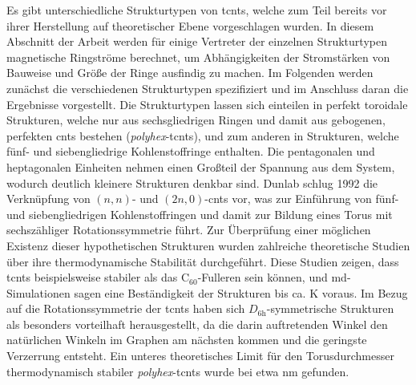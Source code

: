 Es gibt unterschiedliche Strukturtypen von \acp{tcnt}, welche zum Teil bereits vor ihrer Herstellung auf theoretischer Ebene vorgeschlagen wurden. In diesem Abschnitt der Arbeit werden für einige Vertreter der einzelnen Strukturtypen magnetische Ringströme berechnet, um Abhängigkeiten der Stromstärken von Bauweise und Größe der Ringe ausfindig zu machen. Im Folgenden werden zunächst die verschiedenen Strukturtypen spezifiziert und im Anschluss daran die Ergebnisse vorgestellt.   
Die Strukturtypen lassen sich einteilen in perfekt toroidale Strukturen, welche nur aus sechsgliedrigen Ringen und damit aus gebogenen, perfekten \acp{cnt} bestehen (\textit{polyhex}-\acp{tcnt}), und zum anderen in Strukturen, welche fünf- und siebengliedrige Kohlenstoffringe enthalten. Die pentagonalen und heptagonalen Einheiten nehmen einen Großteil der Spannung aus dem System, wodurch deutlich kleinere Strukturen denkbar sind. Dunlab\supercite{dunlap1992connecting} schlug 1992 die Verknüpfung von $(n,n)$- und $(2n,0)$-\acp{cnt} vor, was zur Einführung von fünf- und siebengliedrigen Kohlenstoffringen und damit zur Bildung eines Torus mit sechszähliger Rotationssymmetrie führt. Zur Überprüfung einer möglichen Existenz dieser hypothetischen Strukturen wurden zahlreiche theoretische Studien über ihre thermodynamische Stabilität durchgeführt. Diese Studien zeigen, dass \acp{tcnt} beispielsweise stabiler als das C$_{60}$-Fulleren\supercite{dunlap1992connecting,itoh1993toroidal,ihara1993toroidal,itoh1993toroidal2} sein können, und \ac{md}-Simulationen\supercite{itoh1993toroidal,hod2003carbon,tacsci2005stability,chen2011thermal} sagen eine Beständigkeit der Strukturen bis ca. \unit[2000]{K} voraus. Im Bezug auf die Rotationssymmetrie der \acp{tcnt} haben sich $D_{\text{6h}}$-symmetrische Strukturen als besonders vorteilhaft herausgestellt\supercite{liu2011structure,ihara1995helically}, da die darin auftretenden Winkel den natürlichen Winkeln im Graphen am nächsten kommen und die geringste Verzerrung entsteht. Ein unteres theoretisches Limit für den Torusdurchmesser thermodynamisch stabiler \textit{polyhex}-\acp{tcnt} wurde bei etwa \unit[200]{nm} gefunden.\supercite{meunier1998atomic}\\

